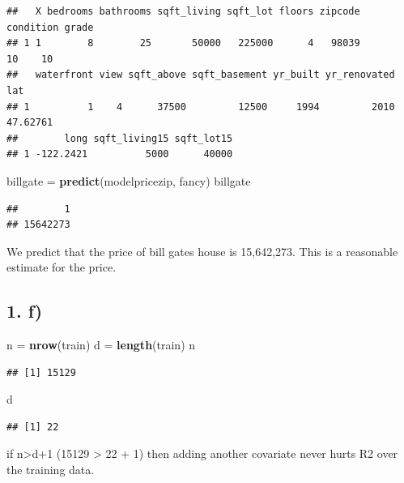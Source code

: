 \documentclass[
]{article}
\newenvironment{Shaded}{\begin{snugshade}}{\end{snugshade}}
\newcommand{\KeywordTok}[1]{\textcolor[rgb]{0.13,0.29,0.53}{\textbf{#1}}}
\newcommand{\NormalTok}[1]{#1}
\newcommand{\StringTok}[1]{\textcolor[rgb]{0.31,0.60,0.02}{#1}}
\begin{document}
\begin{verbatim}
##   X bedrooms bathrooms sqft_living sqft_lot floors zipcode condition grade
## 1 1        8        25       50000   225000      4   98039        10    10
##   waterfront view sqft_above sqft_basement yr_built yr_renovated      lat
## 1          1    4      37500         12500     1994         2010 47.62761
##        long sqft_living15 sqft_lot15
## 1 -122.2421          5000      40000
\end{verbatim}

\begin{Shaded}
\begin{Highlighting}[]
\NormalTok{billgate =}\StringTok{ }\KeywordTok{predict}\NormalTok{(modelpricezip, fancy)}
\NormalTok{billgate}
\end{Highlighting}
\end{Shaded}

\begin{verbatim}
##        1 
## 15642273
\end{verbatim}

We predict that the price of bill gates house is 15,642,273. This is a
reasonable estimate for the price.

\hypertarget{f}{%
\subsection{1. f)}\label{f}}

\begin{Shaded}
\begin{Highlighting}[]
\NormalTok{n =}\StringTok{ }\KeywordTok{nrow}\NormalTok{(train)}
\NormalTok{d =}\StringTok{ }\KeywordTok{length}\NormalTok{(train)}
\NormalTok{n}
\end{Highlighting}
\end{Shaded}

\begin{verbatim}
## [1] 15129
\end{verbatim}

\begin{Shaded}
\begin{Highlighting}[]
\NormalTok{d}
\end{Highlighting}
\end{Shaded}

\begin{verbatim}
## [1] 22
\end{verbatim}

if n\textgreater d+1 (15129 \textgreater{} 22 + 1) then adding another
covariate never hurts R2 over the training data.
\end{document}
